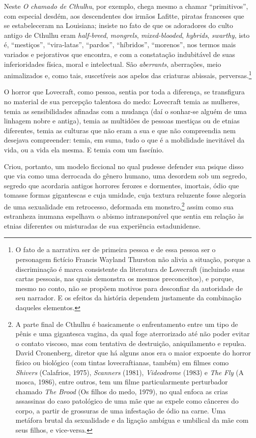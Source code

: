 Neste \emph{O chamado de Cthulhu}, por exemplo, chega mesmo a chamar
``primitivos'', com especial desdém, aos descendentes dos irmãos
Lafitte, piratas franceses que se estabeleceram na Louisiana; insiste no
fato de que os adoradores do culto antigo de Cthulhu eram
\emph{half-breed}, \emph{mongrels}, \emph{mixed-blooded}, \emph{hybrids},
\emph{swarthy}, isto é, ``mestiços'', ``vira-latas'', ``pardos'',
``híbridos'', ``morenos'', nos termos mais variados e pejorativos que
encontra, e com a constatação indubitável de suas inferioridades
física, moral e intelectual. São \emph{aberrants}, aberrações, meio
animalizados e, como tais, suscetíveis aos apelos das criaturas
abissais, perversas.\footnote{O fato de a narrativa ser de primeira
  pessoa e de essa pessoa ser o personagem fictício Francis Wayland
  Thurston não alivia a situação, porque a discriminação é marca
  consistente da literatura de Lovecraft (incluindo suas cartas
  pessoais, nas quais demonstra os mesmos preconceitos), e porque, mesmo
  no conto, não se propõem motivos para desconfiar da
  autoridade de seu narrador. E os efeitos da história dependem
  justamente da combinação daqueles elementos.}

O horror que Lovecraft, como pessoa, sentia por toda a diferença, se
transfigura no material de sua percepção talentosa do medo: Lovecraft
temia as mulheres, temia as sensibilidades afinadas com a mudança (daí o
sonhar-se alguém de uma linhagem nobre e antiga), temia as multidões de
pessoas mestiças ou de etnias diferentes, temia as culturas que não eram
a sua e que não compreendia nem desejava compreender: temia, em suma,
tudo o que é a mobilidade inevitável da vida, ou a vida ela mesma. E
temia com um fascínio.

Criou, portanto, um modelo ficcional no qual pudesse defender sua psique
disso que via como uma derrocada do gênero humano, uma desordem sob um
segredo, segredo que acordaria antigos horrores ferozes e dormentes,
imortais, ódio que tomasse formas gigantescas e cuja umidade, cuja
textura reluzente fosse alegoria de uma sexualidade em retrocesso,
deformada em monstro,\footnote{A parte final de Cthulhu é basicamente o
  enfrentamento entre um tipo de pênis e uma gigantesca vagina, da qual
  foge aterrorizado até não poder evitar o contato viscoso, mas com
  tentativa de destruição, aniquilamento e repulsa. David Cronenberg, diretor que há alguns anos era o maior expoente do
  horror físico ou biológico (com tintas lovecraftianas,
  também) em filmes como \emph{Shivers} (Calafrios, 1975),
  \emph{Scanners} (1981), \emph{Videodrome} (1983) e \emph{The Fly} (A
  mosca, 1986), entre outros, tem um filme particularmente perturbador
  chamado \emph{The Brood} (Os filhos do medo, 1979), no qual enfoca as
  crias assassinas do caso patológico de uma mãe que as expele como
  cânceres do corpo, a partir de grossuras de uma infestação de ódio na
  carne. Uma metáfora brutal da sexualidade e da ligação ambígua e
  umbilical da mãe com seus filhos, e vice-versa.} assim como sua
estranheza inumana espelhava o abismo intransponível que sentia em
relação às etnias diferentes ou misturadas de sua experiência
estadunidense.

